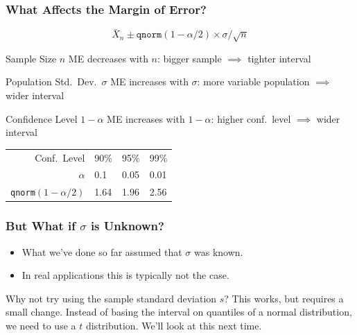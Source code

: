 \documentclass[handout]{beamer}
\begin{document}
\begin{frame}
\frametitle{What Affects the Margin of Error?}

	$$\boxed{\bar{X}_n \pm \texttt{qnorm}(1-\alpha/2) \times \sigma/\sqrt{n}}$$


	
\begin{block}{Sample Size $n$}
ME decreases with $n$: bigger sample $\implies$ tighter interval
\end{block}


\begin{block}{Population Std.\ Dev.\ $\sigma$}
ME increases with $\sigma$: more variable population $\implies$ wider interval
\end{block}



\begin{block}{Confidence Level $1-\alpha$}
ME increases with $1-\alpha$: higher conf.\ level $\implies$ wider interval

\pause

\begin{center}
	\small
	\begin{tabular}{r|lll}
	\hline
	Conf.\ Level & 90\% & 95\% & 99\% \\
	$\alpha$ & 0.1 & 0.05 & 0.01\\
	\texttt{qnorm}$(1-\alpha/2)$&1.64 & 1.96 & 2.56\\
	\hline
	\end{tabular}
	\end{center}
\end{block}	
\end{frame}

\begin{frame}
\frametitle{But What if $\sigma$ is Unknown?}
	\begin{itemize}
		\item What we've done so far assumed that $\sigma$ was known. 
		\item In real applications this is typically not the case. 
	\end{itemize}

\begin{alertblock}{Why not try using the sample standard deviation $s$?}
This works, but requires a small change. Instead of basing the interval on quantiles of a normal distribution, we need to use a $t$ distribution. We'll look at this next time.
\end{alertblock}

\end{frame}
\end{document}
